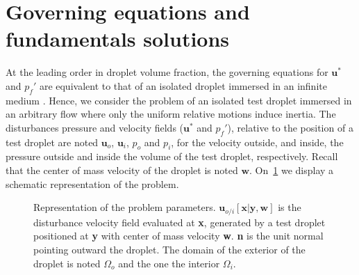 



\section{Governing equations and fundamentals solutions}
\label{sec:governing_equation}

At the leading order in droplet volume fraction, the governing equations for $\textbf{u}^*$ and $p_f'$ are equivalent to that of an isolated droplet immersed in an infinite medium \citep{hinch1977averaged}. 
Hence, we consider the problem of an isolated test droplet immersed in an arbitrary flow where only the uniform relative motions induce inertia. 
The disturbances pressure and velocity fields ($\textbf{u}^*$ and $p_f'$), relative to the position of a test droplet are noted $\textbf{u}_{o}$, $\textbf{u}_{i}$, $p_{o}$ and $p_{i}$, for the velocity outside, and inside, the pressure outside and inside the volume of the test droplet, respectively. 
Recall that the center of mass velocity of the droplet is noted $\textbf{w}$. 
On~\ref{fig:disturbance} we display a schematic representation of the problem. 
\begin{figure}[h!]
    \centering
    \caption{Representation of the problem parameters. $\textbf{u}_{o/i}[\textbf{x}|\textbf{y},\textbf{w}]$ is the disturbance velocity field evaluated at \textbf{x}, generated by a test droplet positioned at \textbf{y} with center of mass velocity \textbf{w}. \textbf{n} is the unit normal  pointing outward the droplet. 
    The domain of the exterior of the droplet is noted $\Omega_o$ and the one the interior $\Omega_i$.}
    \label{fig:disturbance}
\end{figure}

